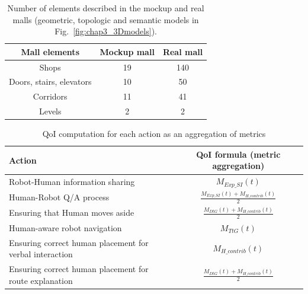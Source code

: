 \documentclass[a4paper,11pt,twoside]{StyleThese}
\begin{document}
\begin{table}[!h]
	\begin{center}
		\begin{tabular}{ | c || c | c | }
			\hline
			Mall elements                   & Mockup mall & Real mall \\ \hline \hline
			Shops              & 19            & 140   \\ \hline
			Doors, stairs, elevators & 10            & 50    \\ \hline
			Corridors              & 11            & 41    \\ \hline
			Levels   & 2            & 2   \\ 
			\hline
		\end{tabular}
	\end{center}
	\caption{\label{tab:malls} Number of elements described in the mockup and real malls (geometric, topologic and semantic models in Fig.~\ref{fig:chap3_3Dmodels}).}
\end{table}

\bgroup
\def\arraystretch{2.5}
\begin{table}[t]
	\centering
	\begin{tabular}{|p{3.5cm}|c|}
		Action & QoI formula (metric aggregation) \\ \hline \hline
		Robot-Human information sharing & $ M_{Exp\_SI}(t)$ \\ \hline
		Human-Robot Q/A process & \(\displaystyle\frac{M_{Exp\_SI}(t) + M_{H\_contrib}(t) }{2}\) \\ \hline
		Ensuring  that  Human  moves  aside  & \(\displaystyle\frac{M_{DtG}(t) + M_{H\_contrib}(t) }{2}\) \\ \hline
		Human-aware robot navigation  & $M_{TtG}(t)$ \\ \hline
		Ensuring correct human placement for verbal interaction & $M_{H\_contrib}(t)$ \\ \hline
		Ensuring correct human placement for route explanation & \(\displaystyle\frac{M_{DtG}(t) + M_{H\_contrib}(t) }{2}\) 
	\end{tabular}
	\caption{QoI computation for each action as an aggregation of metrics}
	\label{tab:qoi}
\end{table}
\egroup
\end{document}
